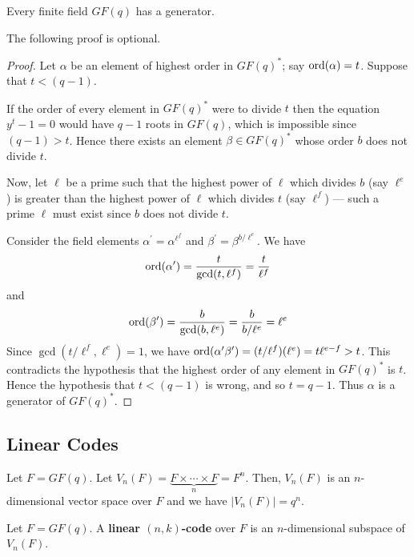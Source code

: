 \begin{thmbox}
    \begin{theorem}
    Every finite field $ GF(q) $ has a generator.
\end{theorem} \end{thmbox}

The following proof is optional.
\begin{proof}
    Let $ \alpha $ be an element of highest order in $ GF(q)^* $;
    say $ \operatorname{ord}(\alpha)=t $. Suppose that $ t<(q-1) $.
    
    If the order of every element in $ GF(q)^* $ were to divide $ t $ then the equation
    $ y^t-1=0 $ would have $ q-1 $ roots in $ GF(q) $, which is impossible
    since $ (q-1)>t $. Hence there exists an element $ \beta\in GF(q)^* $
    whose order $ b $ does not divide $ t $.

    Now, let $ \ell $ be a prime such that the highest power of $ \ell $
    which divides $ b $ (say $ \ell^e $) is greater than the highest
    power of $ \ell $ which divides $ t $ (say $ \ell^f $) --- such a prime
    $ \ell $ must exist since $ b $ does not divide $ t $.

    Consider the field elements $ \alpha^{\prime}=\alpha^{\ell^f} $
    and $ \beta^{\prime}=\beta^{b/\ell^e} $. We have
    \[ \operatorname{ord}(\alpha^{\prime})=\frac{t}{\gcd(t,\ell^f)} =\frac{t}{\ell^f} \]
    and
    \[ \operatorname{ord}(\beta^{\prime})=\frac{b}{\gcd(b,\ell^e)} =\frac{b}{b/\ell^e}=\ell^e \]
    Since $ \gcd(t/\ell^f,\ell^e)=1 $, we have $ \operatorname{ord}(\alpha^{\prime}\beta^{\prime})=
    (t/\ell^f)(\ell^e)=t\ell^{e-f}>t $. This contradicts the hypothesis
    that the highest order of any element in $ GF(q)^* $ is $ t $. Hence the
    hypothesis that $ t<(q-1) $ is wrong, and so $ t=q-1 $. Thus $ \alpha $
    is a generator of $ GF(q)^* $.
\end{proof}

\subsection{Linear Codes}
Let $ F=GF(q) $. Let $ V_n(F)=\underbrace{F\times\cdots\times F}_{n}=F^n $.
Then, $ V_n(F) $ is an $ n $-dimensional vector space over $ F $ and
we have $ |V_n(F)|=q^n $.

\begin{defbox}
    \begin{definition}
    Let $ F=GF(q) $.
    A \textbf{linear $ (n,k) $-code} over $ F $ is an $ n $-dimensional subspace
    of $ V_n(F) $.
\end{definition} \end{defbox}

